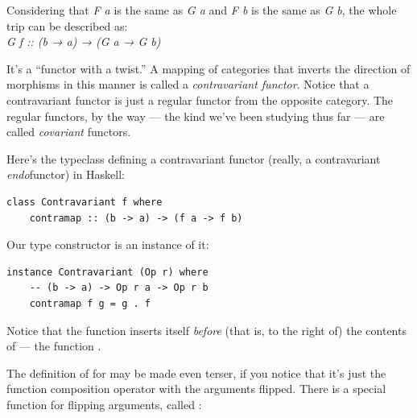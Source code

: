 Considering that \emph{F a} is the same as \emph{G a} and \emph{F b} is
the same as \emph{G b}, the whole trip can be described as:\\
\emph{G f :: (b → a) → (G a → G b)}

It's a ``functor with a twist.'' A mapping of categories that inverts
the direction of morphisms in this manner is called a
\emph{contravariant functor}. Notice that a contravariant functor is
just a regular functor from the opposite category. The regular functors,
by the way --- the kind we've been studying thus far --- are called
\emph{covariant} functors.

\begin{figure}[H]
\centering
{}
\end{figure}

\noindent
Here's the typeclass defining a contravariant functor (really, a
contravariant \emph{endo}functor) in Haskell:

\begin{Verbatim}[commandchars=\\\{\}]
class Contravariant f where
    contramap :: (b -> a) -> (f a -> f b)
\end{Verbatim}
Our type constructor  is an instance of it:

\begin{Verbatim}[commandchars=\\\{\}]
instance Contravariant (Op r) where
    -- (b -> a) -> Op r a -> Op r b
    contramap f g = g . f
\end{Verbatim}
Notice that the function  inserts itself \emph{before} (that
is, to the right of) the contents of  --- the function
.

The definition of  for  may be made even
terser, if you notice that it's just the function composition operator
with the arguments flipped. There is a special function for flipping
arguments, called :

